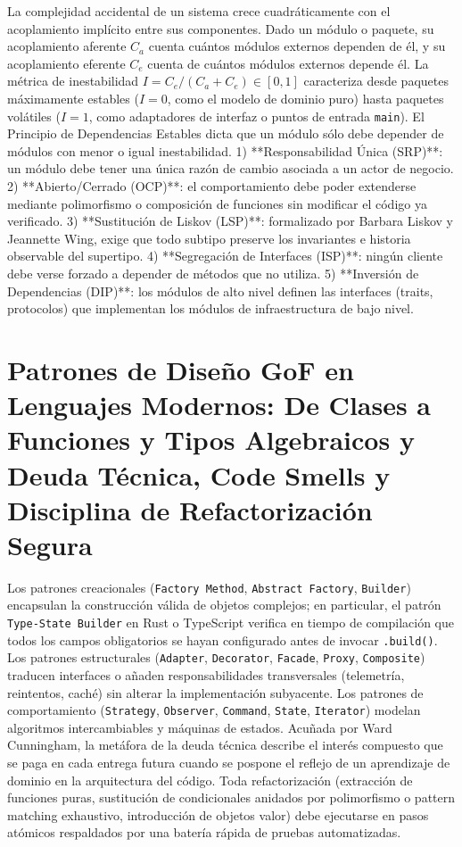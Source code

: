 \documentclass{book}
\begin{document}
La complejidad accidental de un sistema crece cuadráticamente con el acoplamiento implícito entre sus componentes. Dado un módulo o paquete, su acoplamiento aferente \(C_a\) cuenta cuántos módulos externos dependen de él, y su acoplamiento eferente \(C_e\) cuenta de cuántos módulos externos depende él. La métrica de inestabilidad \(I = C_e / (C_a + C_e) \in [0, 1]\) caracteriza desde paquetes máximamente estables (\(I = 0\), como el modelo de dominio puro) hasta paquetes volátiles (\(I = 1\), como adaptadores de interfaz o puntos de entrada \texttt{main}). El Principio de Dependencias Estables dicta que un módulo sólo debe depender de módulos con menor o igual inestabilidad.
1) **Responsabilidad Única (SRP)**: un módulo debe tener una única razón de cambio asociada a un actor de negocio. 2) **Abierto/Cerrado (OCP)**: el comportamiento debe poder extenderse mediante polimorfismo o composición de funciones sin modificar el código ya verificado. 3) **Sustitución de Liskov (LSP)**: formalizado por Barbara Liskov y Jeannette Wing, exige que todo subtipo preserve los invariantes e historia observable del supertipo. 4) **Segregación de Interfaces (ISP)**: ningún cliente debe verse forzado a depender de métodos que no utiliza. 5) **Inversión de Dependencias (DIP)**: los módulos de alto nivel definen las interfaces (traits, protocolos) que implementan los módulos de infraestructura de bajo nivel.

\section{Patrones de Diseño GoF en Lenguajes Modernos: De Clases a Funciones y Tipos Algebraicos y Deuda Técnica, Code Smells y Disciplina de Refactorización Segura}

Los patrones creacionales (\texttt{Factory Method}, \texttt{Abstract Factory}, \texttt{Builder}) encapsulan la construcción válida de objetos complejos; en particular, el patrón \texttt{Type-State Builder} en Rust o TypeScript verifica en tiempo de compilación que todos los campos obligatorios se hayan configurado antes de invocar \texttt{.build()}. Los patrones estructurales (\texttt{Adapter}, \texttt{Decorator}, \texttt{Facade}, \texttt{Proxy}, \texttt{Composite}) traducen interfaces o añaden responsabilidades transversales (telemetría, reintentos, caché) sin alterar la implementación subyacente. Los patrones de comportamiento (\texttt{Strategy}, \texttt{Observer}, \texttt{Command}, \texttt{State}, \texttt{Iterator}) modelan algoritmos intercambiables y máquinas de estados.
Acuñada por Ward Cunningham, la metáfora de la deuda técnica describe el interés compuesto que se paga en cada entrega futura cuando se pospone el reflejo de un aprendizaje de dominio en la arquitectura del código. Toda refactorización (extracción de funciones puras, sustitución de condicionales anidados por polimorfismo o pattern matching exhaustivo, introducción de objetos valor) debe ejecutarse en pasos atómicos respaldados por una batería rápida de pruebas automatizadas.
\end{document}
